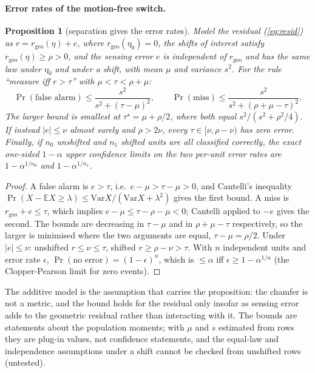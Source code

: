 \documentclass{article}
\newtheorem{proposition}{Proposition}
\newcommand{\ph}{\textsuperscript{\dag}}
\begin{document}
\paragraph{Error rates of the motion-free switch\ph.}

\begin{proposition}[separation gives the error rates]
\label{prop:switch}
Model the residual (\ref{eq:resid}) as $r = r_{\mathrm{geo}}(\eta) + e$, where $r_{\mathrm{geo}}(\eta_0) = 0$, the
shifts of interest satisfy $r_{\mathrm{geo}}(\eta) \ge \rho > 0$, and the sensing error $e$ is independent of
$r_{\mathrm{geo}}$ and has the same law under $\eta_0$ and under a shift, with mean $\mu$ and variance $s^2$. For the rule ``measure iff $r > \tau$'' with
$\mu < \tau < \rho + \mu$:
\begin{equation}
\Pr(\text{false alarm}) \le \frac{s^2}{s^2 + (\tau - \mu)^2}, \qquad
\Pr(\text{miss}) \le \frac{s^2}{s^2 + (\rho + \mu - \tau)^2} .
\label{eq:cantelli}
\end{equation}
The larger bound is smallest at $\tau^\star = \mu + \rho/2$, where both equal $s^2 / (s^2 + \rho^2/4)$. If instead
$|e| \le \nu$ almost surely and $\rho > 2\nu$, every $\tau \in [\nu, \rho - \nu)$ has zero error. Finally, if $n_0$
unshifted and $n_1$ shifted units are all classified correctly, the exact one-sided $1 - \alpha$ upper confidence limits
on the two per-unit error rates are $1 - \alpha^{1/n_0}$ and $1 - \alpha^{1/n_1}$.
\end{proposition}

\begin{proof}
A false alarm is $e > \tau$, i.e.\ $e - \mu > \tau - \mu > 0$, and Cantelli's inequality $\Pr(X - \mathbb{E}X \ge
\lambda) \le \mathrm{Var}X/(\mathrm{Var}X + \lambda^2)$ gives the first bound. A miss is $r_{\mathrm{geo}} + e \le
\tau$, which implies $e - \mu \le \tau - \rho - \mu < 0$; Cantelli applied to $-e$ gives the second. The bounds are
decreasing in $\tau - \mu$ and in $\rho + \mu - \tau$ respectively, so the larger is minimised where the two
arguments are equal, $\tau - \mu = \rho/2$. Under $|e| \le \nu$: unshifted $r \le \nu \le \tau$, shifted $r \ge \rho -
\nu > \tau$. With $n$ independent units and error rate $\epsilon$, $\Pr(\text{no error}) = (1-\epsilon)^n$, which is
$\le \alpha$ iff $\epsilon \ge 1 - \alpha^{1/n}$ (the Clopper-Pearson limit for zero events).
\end{proof}

The additive model is the assumption that carries the proposition: the chamfer is not a metric, and the bound holds
for the residual only insofar as sensing error adds to the geometric residual rather than interacting with it. The
bounds are statements about the population moments; with $\mu$ and $s$ estimated from rows they are plug-in values, not
confidence statements, and the equal-law and independence assumptions under a shift cannot be checked from unshifted
rows (untested).
\end{document}
